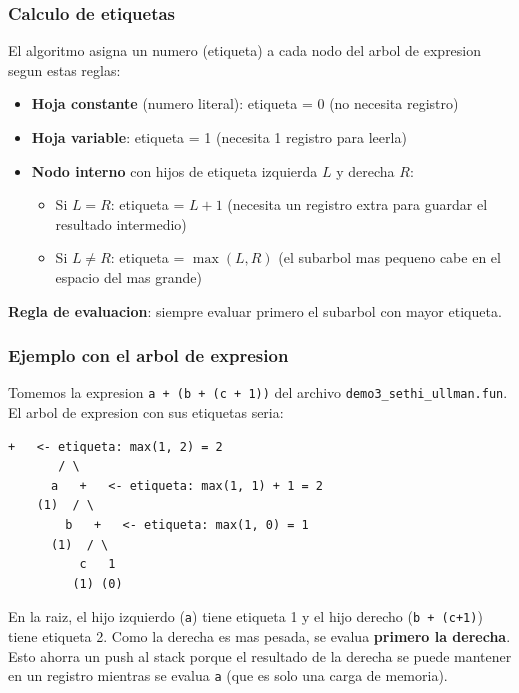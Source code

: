 \documentclass[12pt, a4paper]{article}
\begin{document}
\subsubsection{Calculo de etiquetas}

El algoritmo asigna un numero (etiqueta) a cada nodo del arbol de expresion segun estas reglas:

\begin{itemize}
    \item \textbf{Hoja constante} (numero literal): etiqueta = 0 (no necesita registro)
    \item \textbf{Hoja variable}: etiqueta = 1 (necesita 1 registro para leerla)
    \item \textbf{Nodo interno} con hijos de etiqueta izquierda $L$ y derecha $R$:
    \begin{itemize}
        \item Si $L = R$: etiqueta = $L + 1$ (necesita un registro extra para guardar el resultado intermedio)
        \item Si $L \neq R$: etiqueta = $\max(L, R)$ (el subarbol mas pequeno cabe en el espacio del mas grande)
    \end{itemize}
\end{itemize}

\textbf{Regla de evaluacion}: siempre evaluar primero el subarbol con mayor etiqueta.

\subsubsection{Ejemplo con el arbol de expresion}

Tomemos la expresion \texttt{a + (b + (c + 1))} del archivo \texttt{demo3\_sethi\_ullman.fun}. El arbol de expresion con sus etiquetas seria:

\begin{lstlisting}[style=grammarstyle, caption={Arbol de etiquetas Sethi-Ullman}]
        +   <- etiqueta: max(1, 2) = 2
       / \
      a   +   <- etiqueta: max(1, 1) + 1 = 2
    (1)  / \
        b   +   <- etiqueta: max(1, 0) = 1
      (1)  / \
          c   1
         (1) (0)
\end{lstlisting}

En la raiz, el hijo izquierdo (\texttt{a}) tiene etiqueta 1 y el hijo derecho (\texttt{b + (c+1)}) tiene etiqueta 2. Como la derecha es mas pesada, se evalua \textbf{primero la derecha}. Esto ahorra un push al stack porque el resultado de la derecha se puede mantener en un registro mientras se evalua \texttt{a} (que es solo una carga de memoria).
\end{document}
